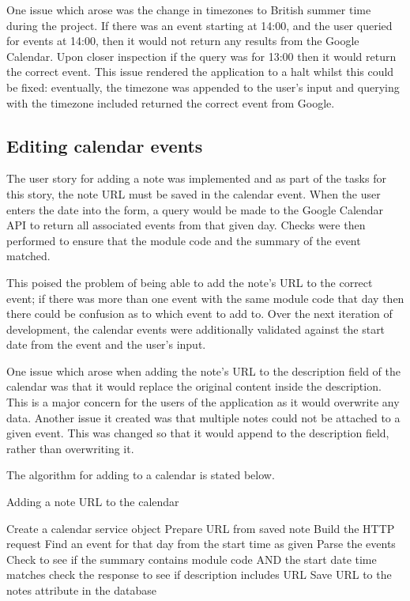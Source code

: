 {{{{{{{One issue which arose was the change in timezones to British summer time during the project. If there was an event starting at 14:00, and the user queried for events at 14:00, then it would not return any results from the Google Calendar. Upon closer inspection if the query was for 13:00 then it would return the correct event. This issue rendered the application to a halt whilst this could be fixed: eventually, the timezone was appended to the user's input and querying with the timezone included returned the correct event from Google.

\subsection{Editing calendar events}
The user story for adding a note was implemented and as part of the tasks for this story, the note URL must be saved in the calendar event. When the user enters the date into the form, a query would be made to the Google Calendar API to return all associated events from that given day. Checks were then performed to ensure that the module code and the summary of the event matched.

This poised the problem of being able to add the note's URL to the correct event; if there was more than one event with the same module code that day then there could be confusion as to which event to add to.
Over the next iteration of development, the calendar events were additionally validated against the start date from the event and the user's input.

One issue which arose when adding the note's URL to the description field of the calendar was that it would replace the original content inside the description. This is a major concern for the users of the application as it would overwrite any data. Another issue it created was that multiple notes could not be attached to a given event. This was changed so that it would append to the description field, rather than overwriting it.

The algorithm for adding to a calendar is stated below.
\begin{algorithm}
  \caption{Adding a note URL to the calendar}
  \label{algorithm:threshold1}
  \begin{algorithmic}[1]
      \State Create a calendar service object
      \State Prepare URL from saved note
      \State Build the HTTP request
      \State Find an event for that day from the start time as given
      \State Parse the events
      \State Check to see if the summary contains module code AND the start date time matches
        \State check the response to see if description includes URL
        \State Save URL to the notes attribute in the database
      \EndIf
  \end{algorithmic}
\end{algorithm}

}}}}}}}
